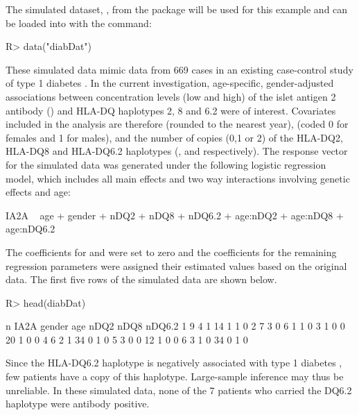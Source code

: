 \documentclass[article, shortnames]{jss}
\begin{document}
The simulated dataset, , from the  package
will be used for this example and can be loaded into 
with the command:
\begin{CodeInput}
R> data("diabDat")
\end{CodeInput}
These simulated data mimic data from 669 cases in an existing
case-control study of type 1 diabetes \citep{Graham:1999}. In the
current investigation, age-specific, gender-adjusted associations
between concentration levels (low and high) of the islet antigen 2
antibody () and HLA-DQ haplotypes 2, 8 and 6.2 were of
interest. Covariates included in the analysis are therefore
 (rounded to the nearest year),  (coded 0
for females and 1 for males), and the number of copies (0,1 or 2)
of the HLA-DQ2, HLA-DQ8 and HLA-DQ6.2 haplotypes (,
 and  respectively). The response vector
for the simulated data was generated under the following logistic
regression model, which includes all main effects and two way
interactions involving genetic effects and age:
\begin{Code}
IA2A ~ age + gender + nDQ2 + nDQ8 + nDQ6.2 + age:nDQ2 + age:nDQ8 + age:nDQ6.2
\end{Code}
The coefficients for  and  were set
to zero and the coefficients for the remaining regression
parameters were assigned their estimated values based on the
original data. The first five rows of the simulated data are shown
below.
\begin{CodeChunk}
\begin{CodeInput}
R> head(diabDat)
\end{CodeInput}
\begin{CodeOutput}
  n IA2A gender age nDQ2 nDQ8 nDQ6.2
1 9    4      1  14    1    1      0
2 7    3      0   6    1    1      0
3 1    0      0  20    1    0      0
4 6    2      1  34    0    1      0
5 3    0      0  12    1    0      0
6 3    1      0  34    0    1      0
\end{CodeOutput}
\end{CodeChunk}
Since the HLA-DQ6.2 haplotype is negatively associated with
type 1 diabetes \citep[e.g.][]{Graham:1999}, few patients
have a copy of this haplotype.
Large-sample inference
may thus be
unreliable.
In these simulated data, none of the 7 patients
who carried the DQ6.2 haplotype
were antibody positive.
\end{document}
